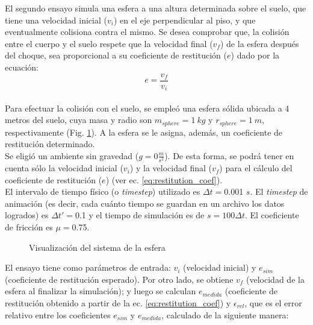 \documentclass{article}
\begin{document}
El segundo ensayo simula una esfera a una altura determinada sobre el suelo, que tiene una velocidad inicial ($v_{i}$) en el eje perpendicular al piso, y que eventualmente colisiona contra el mismo.
Se desea comprobar que, la colisi\'on entre el cuerpo y el suelo respete que la velocidad final ($v_{f}$) de la esfera despu\'es del choque, sea proporcional a su coeficiente de restituci\'on ($e$) dado por la ecuaci\'on:
 \begin{equation}
 \label{eq:restitution_coef}
  e = \frac{v_f}{v_i} 
\end{equation}
\\
Para efectuar la colisi\'on con el suelo, se emple\'o una esfera s\'olida ubicada a 4 metros del suelo, cuya masa y radio son $m_{sphere} = 1\ kg$ y $r_{sphere}=1\ m$,
respectivamente (Fig. \ref{fig:fallingBall}).  A la esfera se le asigna, adem\'as, un coeficiente de restituci\'on determinado.\\
Se eligi\'o un ambiente sin gravedad ($g = 0 \frac{m}{s^2}$). De esta forma, se podr\'a tener en cuenta s\'olo la velocidad inicial ($v_{i}$) y la velocidad final ($v_{f}$) para el c\'alculo del coeficiente de restituci\'on ($e$) (ver ec. \eqref{eq:restitution_coef}).\\
El intervalo de tiempo f\'isico (o \textit{timestep}) utilizado es $\Delta t=$0.001 $s$. El \textit{timestep} de animaci\'on (es decir,
cada cu\'anto tiempo se guardan en un archivo los datos logrados) es $\Delta t' = $0.1 y el tiempo de simulaci\'on es de $s=100\Delta t$. El coeficiente de fricci\'on es $\mu = $0.75. \\
\begin{figure}[H]%
  \centering
    \caption{Visualizaci\'on del sistema de la esfera}
    \label{fig:fallingBall} 
\end{figure} 
\vspace{10pt} 
\noindent El ensayo tiene como par\'ametros de entrada: $v_{i}$ (velocidad inicial) y $e_{sim}$ (coeficiente de restituci\'on esperado). Por otro lado, se obtiene $v_{f}$ (velocidad de la esfera al finalizar la simulaci\'on); y luego se calculan $e_{medida}$ (coeficiente de restituci\'on obtenido a partir de la ec. \eqref{eq:restitution_coef}) y $\epsilon_{rel}$, que es el error relativo entre los coeficientes $e_{sim}$ y $e_{medida}$, calculado de la siguiente manera: \\
\end{document}
